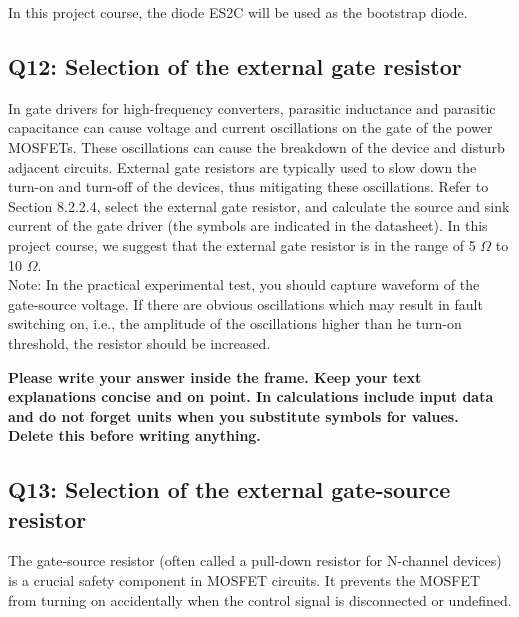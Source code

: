 \documentclass{PELsmallreport}
\begin{document}
In this project course, the diode ES2C will be used as the bootstrap diode.\\

 \quad{} \quad \hfill{}

\subsection{Q12: Selection of the external gate resistor}
In gate drivers for high-frequency converters, parasitic inductance and parasitic capacitance can cause voltage and current oscillations on the gate of the power MOSFETs. These oscillations can cause the breakdown of the device and disturb adjacent circuits. External gate resistors are typically used to slow down the turn-on and turn-off of the devices, thus mitigating these oscillations. Refer to Section 8.2.2.4, select the external gate resistor, and calculate the source and sink current of the gate driver (the symbols are indicated in the datasheet). In this project course, we suggest that the external gate resistor is in the range of 5 $\Omega$ to 10 $\Omega$. \\

Note: In the practical experimental test, you should capture waveform of the gate-source voltage. If there are obvious oscillations which may result in fault switching on, i.e., the amplitude of the oscillations higher than he turn-on threshold, the resistor should be increased. 

\begin{framed}
	\vspace{2em}
	\textbf{Please write your answer inside the frame. Keep your text explanations concise and on point. In calculations include input data and do not forget units when you substitute symbols for values. \\ Delete this before writing anything.}
	\vspace{2em}
\end{framed}
 \quad {}\quad {}\quad {}\quad {}\hfill{}


\subsection{Q13: Selection of the external gate-source resistor}
The gate-source resistor (often called a pull-down resistor for N-channel devices) is a crucial safety component in MOSFET circuits. It prevents the MOSFET from turning on accidentally when the control signal is disconnected or undefined. 
\end{document}
